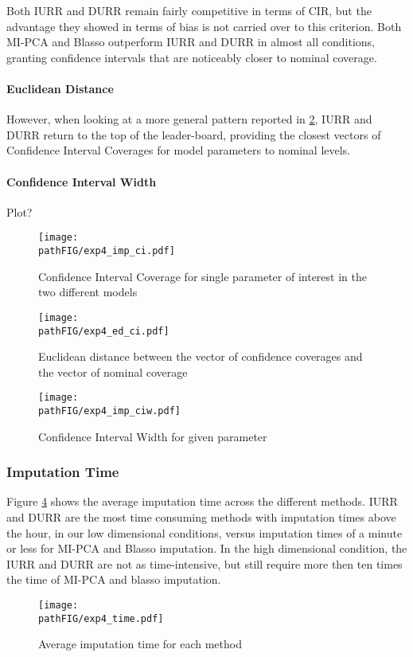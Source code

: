 	Both IURR and DURR remain fairly competitive in terms of CIR, but the advantage they showed in terms of bias
	is not carried over to this criterion.
	Both MI-PCA and Blasso outperform IURR and DURR in almost all conditions, granting confidence intervals that 
	are noticeably closer to nominal coverage.
	
	\paragraph{Euclidean Distance}
	However, when looking at a more general pattern reported in \ref{fig:exp4cied}, IURR and DURR return to 
	the top of the leader-board, providing the closest vectors of Confidence Interval Coverages for model parameters 
	to nominal levels.

	\paragraph{Confidence Interval Width}
	Plot?

\begin{figure}
	\texttt{[image: \\pathFIG/exp4\_imp\_ci.pdf]}
	\caption{Confidence Interval Coverage for single parameter of interest in the two 
		different models}
	\label{fig:exp4ci}
\end{figure}

\begin{figure}
	\texttt{[image: \\pathFIG/exp4\_ed\_ci.pdf]}
	\caption{Euclidean distance between the vector of confidence coverages and the vector of 
		nominal coverage}
	\label{fig:exp4cied}
\end{figure}

\begin{figure}
	\texttt{[image: \\pathFIG/exp4\_imp\_ciw.pdf]}
	\caption{Confidence Interval Width for given parameter}
	\label{fig:exp4ciw}
\end{figure}

\FloatBarrier

\subsubsection{Imputation Time}

	Figure \ref{fig:exp4time} shows the average imputation time across the different methods.
	IURR and DURR are the most time consuming methods with imputation times above the hour, 
	in our low dimensional conditions, versus imputation times of a minute or less for MI-PCA and 
	Blasso imputation.
	In the high dimensional condition, the IURR and DURR are not as time-intensive, but still 
	require more then ten times the time of MI-PCA and blasso imputation.

\begin{figure}
	\texttt{[image: \\pathFIG/exp4\_time.pdf]}
	\caption{Average imputation time for each method}
	\label{fig:exp4time}
\end{figure}

\FloatBarrier


